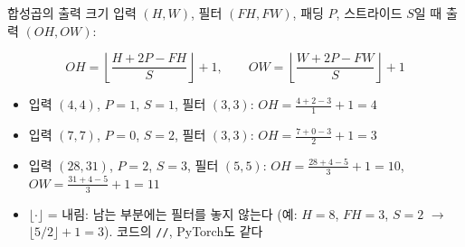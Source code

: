 \documentclass[aspectratio=169,11pt]{beamer}
\begin{document}
\begin{frame}{합성곱의 출력 크기}
입력 $(H,W)$, 필터 $(FH,FW)$, 패딩 $P$, 스트라이드 $S$일 때 출력 $(OH,OW)$:
\begin{keybox}[합성곱의 출력 크기]
\[
OH=\left\lfloor\frac{H+2P-FH}{S}\right\rfloor+1,\qquad OW=\left\lfloor\frac{W+2P-FW}{S}\right\rfloor+1
\]
\end{keybox}
\begin{itemize}
\item 입력 $(4,4)$, $P=1$, $S=1$, 필터 $(3,3)$: $OH=\frac{4+2-3}{1}+1=4$
\item 입력 $(7,7)$, $P=0$, $S=2$, 필터 $(3,3)$: $OH=\frac{7+0-3}{2}+1=3$
\item 입력 $(28,31)$, $P=2$, $S=3$, 필터 $(5,5)$: $OH=\frac{28+4-5}{3}+1=10$, $OW=\frac{31+4-5}{3}+1=11$
\item $\lfloor\cdot\rfloor$ = 내림: 남는 부분에는 필터를 놓지 않는다 (예: $H=8$, $FH=3$, $S=2$ $\to$ $\lfloor 5/2\rfloor+1=3$). 코드의 \texttt{//}, PyTorch도 같다
\end{itemize}
\end{frame}
\end{document}
